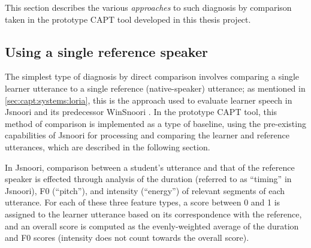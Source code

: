 This section describes the various \textit{approaches} to such diagnosis by comparison taken in the prototype CAPT tool developed in this thesis project. 
  



	
	\subsection{Using a single reference speaker}
	\label{sec:compare:single}
	
	
	The simplest type of diagnosis by direct comparison involves comparing a single learner utterance to a single reference (native-speaker) utterance; as mentioned in \cref{sec:capt:systems:loria}, this is the approach used to evaluate learner speech in Jsnoori and its predecessor WinSnoori \citep{Bonneau2004,Henry2007,Bonneau2011}. 
	In the prototype CAPT tool, this method of comparison is implemented as a type of baseline, using the pre-existing capabilities of Jsnoori for processing and comparing the learner and reference utterances, which are described in the following section. 
	
	
	In Jsnoori, comparison between a student's utterance and that of the reference speaker is effected through analysis of the duration (referred to as ``timing'' in Jsnoori), F0 (``pitch''), and intensity (``energy'') of relevant segments of each utterance.  For each of these three feature types, a score between 0 and 1 is assigned to the learner utterance based on its correspondence with the reference, and an overall score is computed as the evenly-weighted average of the duration and F0 scores (intensity does not count towards the overall score). 
	
